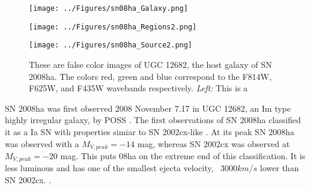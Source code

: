 \documentclass[preprint]{aastex}
\begin{document}
\begin{center}
\begin{figure}
\begin{minipage}[c][5cm][t]{.52\textwidth}
  \texttt{[image: ../Figures/sn08ha\_Galaxy.png]}
  \label{fig:08hagal}
\end{minipage}%
\begin{minipage}[c][5cm][t]{.49\textwidth}
  \texttt{[image: ../Figures/sn08ha\_Regions2.png]}
  \label{fig:r08ha}\par%
  \texttt{[image: ../Figures/sn08ha\_Source2.png]}
  \label{fig:s08ha}
\end{minipage}
\caption{These are false color images of UGC 12682, the host galaxy of SN 2008ha. The colors
red, green and blue correspond to the F814W, F625W, and F435W wavebands respectively. \textit{Left:} This is a }

\end{figure}  
\end{center}
SN 2008ha was first observed 2008 November 7.17 in UGC 12682, 
an Im type highly irregular galaxy, by POSS \citep{puc08}.
The first observations of SN 2008ha classified it as 
a Ia SN with properties simiar to SN 2002cx-like \citep{fol08}. 
At its peak SN 2008ha was observed with a $M_{V,peak} = -14$ mag, 
whereas SN 2002cx was observed at  $M_{V,peak} = -20$ mag. 
This puts 08ha on the extreme end of this classification. 
It is less luminous and has one of the smallest ejecta velocity, ~3000$km/s$ lower than SN 2002cx. 
 \citep{fol09,fol1001,val09}.
\end{document}
